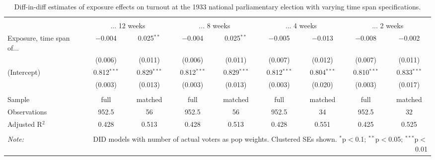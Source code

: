 
\begin{table}[!htbp] \centering 
  \caption{Diff-in-diff estimates of exposure effects on turnout at the 1933 national parliamentary election with varying time span specifications.\vspace{-.25cm}} 
  \label{tab:turnout-timespan-dd-1933} 
\scriptsize 
\begin{tabular}{@{\extracolsep{5pt}}lcccccccc} 
\\[-1.8ex]\hline 
\hline \\[-1.8ex] 
 & \multicolumn{2}{c}{... 12 weeks} & \multicolumn{2}{c}{... 8 weeks} & \multicolumn{2}{c}{... 4 weeks} & \multicolumn{2}{c}{... 2 weeks} \\ 
 \cmidrule(r){2-3}\cmidrule(r){4-5}\cmidrule(r){6-7}\cmidrule(r){8-9}Exposure, time span of... & $-$0.004 & 0.025$^{**}$ & $-$0.004 & 0.025$^{**}$ & $-$0.005 & $-$0.013 & $-$0.008 & $-$0.002 \\ 
  & (0.006) & (0.011) & (0.006) & (0.011) & (0.007) & (0.012) & (0.007) & (0.011) \\ 
  (Intercept) & 0.812$^{***}$ & 0.829$^{***}$ & 0.812$^{***}$ & 0.829$^{***}$ & 0.812$^{***}$ & 0.804$^{***}$ & 0.810$^{***}$ & 0.833$^{***}$ \\ 
  & (0.003) & (0.013) & (0.003) & (0.013) & (0.003) & (0.020) & (0.003) & (0.017) \\ 
 \hline \\[-1.8ex] 
Sample & full & matched & full & matched & full & matched & full & matched \\ 
Observations & 952.5 & 56 & 952.5 & 56 & 952.5 & 34 & 952.5 & 32 \\ 
Adjusted R$^{2}$ & 0.428 & 0.513 & 0.428 & 0.513 & 0.428 & 0.551 & 0.425 & 0.525 \\ 
\hline 
\hline \\[-1.8ex] 
\textit{Note:}  & \multicolumn{8}{r}{DID models with number of actual voters as pop weights. Clustered SEs shown. $^{*}$p$<$0.1; $^{**}$p$<$0.05; $^{***}$p$<$0.01} \\ 
\end{tabular} 
\end{table} 
